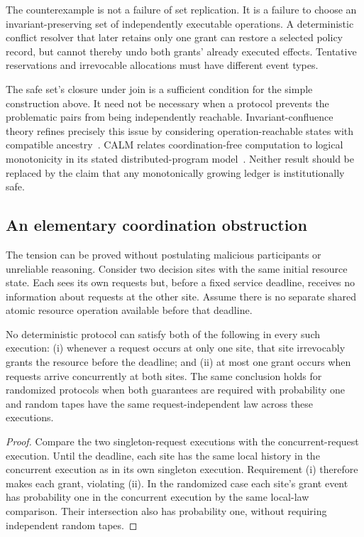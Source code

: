 The counterexample is not a failure of set replication. It is a failure to choose an invariant-preserving set of independently executable operations. A deterministic conflict resolver that later retains only one grant can restore a selected policy record, but cannot thereby undo both grants' already executed effects. Tentative reservations and irrevocable allocations must have different event types.

The safe set's closure under join is a sufficient condition for the simple construction above. It need not be necessary when a protocol prevents the problematic pairs from being independently reachable. Invariant-confluence theory refines precisely this issue by considering operation-reachable states with compatible ancestry~\cite{MS:bailisinvariant}. CALM relates coordination-free computation to logical monotonicity in its stated distributed-program model~\cite{MS:hellerstein-calm}. Neither result should be replaced by the claim that any monotonically growing ledger is institutionally safe.

\subsection{An elementary coordination obstruction}
The tension can be proved without postulating malicious participants or unreliable reasoning. Consider two decision sites with the same initial resource state. Each sees its own requests but, before a fixed service deadline, receives no information about requests at the other site. Assume there is no separate shared atomic resource operation available before that deadline.

\begin{MSproposition}\label{MS:prop:exclusive-service}
No deterministic protocol can satisfy both of the following in every such execution: (i) whenever a request occurs at only one site, that site irrevocably grants the resource before the deadline; and (ii) at most one grant occurs when requests arrive concurrently at both sites. The same conclusion holds for randomized protocols when both guarantees are required with probability one and random tapes have the same request-independent law across these executions.
\end{MSproposition}
\begin{proof}
Compare the two singleton-request executions with the concurrent-request execution. Until the deadline, each site has the same local history in the concurrent execution as in its own singleton execution. Requirement (i) therefore makes each grant, violating (ii). In the randomized case each site's grant event has probability one in the concurrent execution by the same local-law comparison. Their intersection also has probability one, without requiring independent random tapes.
\end{proof}


